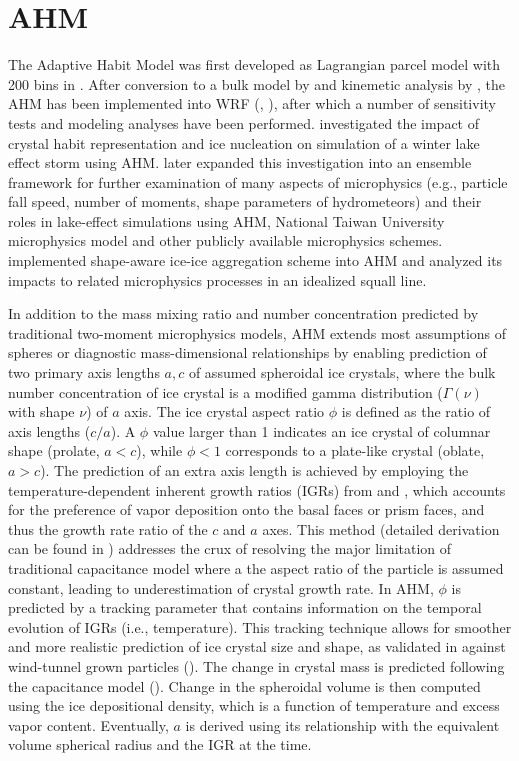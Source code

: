 \section{AHM}
The Adaptive Habit Model was first developed as Lagrangian parcel model with 200 bins in \cite{sulia2011ice}. After conversion to a bulk model by \cite{harrington2013methoda} and kinemetic analysis by \cite{sulia2013method}, the AHM has been implemented into WRF (\cite{harrington2013methoda}, \cite{sulia2014dynamical}), after which a number of sensitivity tests and modeling analyses have been performed. \cite{gaudet2019sensitivity} investigated the impact of crystal habit representation and ice nucleation on simulation of a winter lake effect storm using AHM. \cite{gaudet2021assessment} later expanded this investigation into an ensemble framework for further examination of many aspects of microphysics (e.g., particle fall speed, number of moments, shape parameters of hydrometeors) and their roles in lake-effect simulations using AHM, National Taiwan University microphysics model and other publicly available microphysics schemes. \cite{sulia2021new} implemented shape-aware ice-ice aggregation scheme into AHM and analyzed its impacts to related microphysics processes in an idealized squall line. 

 In addition to the mass mixing ratio and number concentration predicted by traditional two-moment microphysics models, AHM extends most assumptions of spheres or diagnostic mass-dimensional relationships by enabling prediction of two primary axis lengths $a,c$ of assumed spheroidal ice crystals, where the bulk number concentration of ice crystal is a modified gamma distribution ($\Gamma(\nu)$ with shape $\nu$) of $a$ axis. The ice crystal aspect ratio $\phi$ is defined as the ratio of axis lengths ($c/a$). A $\phi$ value larger than 1 indicates an ice crystal of columnar shape (prolate, $a<c$), while $\phi<1$ corresponds to a plate-like crystal (oblate, $a>c$). The prediction of an extra axis length is achieved by employing the temperature-dependent inherent growth ratios (IGRs) from \cite{chen1994theoretical} and \cite{hashino2008spectral}, which accounts for the preference of vapor deposition onto the basal faces or prism faces, and thus the growth rate ratio of the $c$ and $a$ axes. This method (detailed derivation can be found in \cite{chen1994theoretical}) addresses the crux of resolving the major limitation of traditional capacitance model where a the aspect ratio of the particle is assumed constant, leading to underestimation of crystal growth rate. In AHM, $\phi$ is predicted by a tracking parameter that contains information on the temporal evolution of IGRs (i.e., temperature). This tracking technique allows for smoother and more realistic prediction of ice crystal size and shape, as validated in \cite{harrington2013methodb} against wind-tunnel grown particles (\cite{fukuta1999growth}). The change in crystal mass is predicted following the capacitance model (\cite{pruppacher2012microphysics}). Change in the spheroidal volume is then computed using the ice depositional density, which is a function of temperature and excess vapor content. Eventually, $a$ is derived using its relationship with the equivalent volume spherical radius and the IGR at the time.
 
